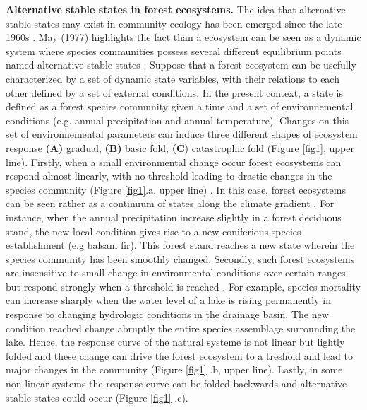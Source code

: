 \textbf{Alternative stable states in forest ecosystems.} The idea that
alternative stable states may exist in community ecology has been emerged
since the late 1960s \cite{Scheffer2001,Society2014a}. May (1977) highlights
the fact than a ecosystem can be seen as a dynamic system where species
communities possess several different equilibrium points named alternative
stable states \cite{May1977}. Suppose that a forest ecosystem can be usefully
characterized by a set of dynamic state variables, with their relations to
each other defined by a set of external conditions. In the present context, a
state is defined as a forest species community given a time and a set of
environnemental conditions (e.g. annual precipitation and annual temperature). Changes
on this set of environnemental parameters can induce three different shapes of ecosystem
response \textbf{(A)} gradual, \textbf{(B)} basic fold, \textbf{(C})
catastrophic fold  \cite{Scheffer2001} (Figure \ref{fig1}, upper line).
Firstly, when a small environmental change occur forest ecosystems can respond
almost linearly, with no threshold leading to drastic changes in the species
community (Figure \ref{fig1}.a, upper line) \cite{Scheffer2001,Scheffer2009}.
In this case, forest ecosystems can be seen rather as a continuum of states
along the climate gradient
\cite{Scheffer2001,Scheffer2009,scheffer2009critical}. For instance, when the
annual precipitation increase slightly in a forest deciduous stand, the new
local condition gives rise to a new coniferious species establishment (e.g
balsam fir). This forest stand reaches a new state wherein the species
community has been smoothly changed. Secondly, such forest ecosystems are
insensitive to small change in environmental conditions over certain ranges
but respond strongly when a threshold is reached \cite{scheffer2009critical}.
For example, species mortality can increase sharply when the water level of a
lake is rising permanently in response to changing hydrologic conditions in
the drainage basin. The new condition reached change abruptly the entire species
assemblage surrounding the lake. Hence, the response curve of the natural
systeme is not linear but lightly folded and these change can drive the forest
ecosystem to a treshold and lead to major changes in the community (Figure
\ref{fig1} .b, upper line). Lastly, in some non-linear systems the response
curve can be folded backwards and alternative stable states could occur
(Figure \ref{fig1} .c).


